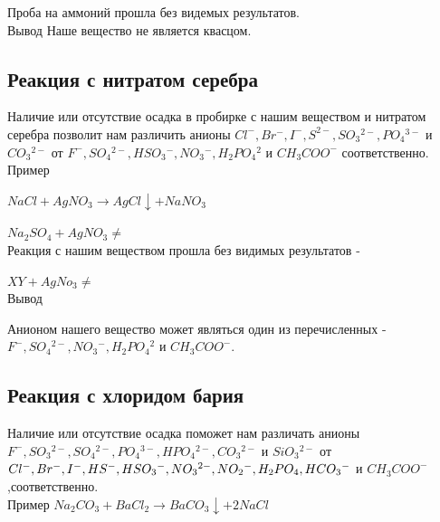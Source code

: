 \documentclass[a4paper,14pt,notitlepage,twoside]{article}
\begin{document}
            Проба на аммоний прошла без видемых результатов.\\

            Вывод\newline
            Наше вещество не является квасцом.



        \subsection{Реакция с нитратом серебра}
            Наличие или отсутствие осадка в пробирке с нашим веществом и нитратом серебра
            позволит нам различить анионы $Cl^-, Br^-, I^-,  S^{2-}, SO_3{}^{2-}, PO_4{}^{3-} $ и $ CO_3{}^{2-}$ 
            от $F^-, SO_4{}^{2-}, HSO_3{}^-, NO_3{}^-, H_2PO_4{}^2$ и $CH_3COO^-$ соответственно.\\
            
            Пример

            $NaCl + AgNO_3 \to AgCl\downarrow + NaNO_3$
            \par$Na_2SO_4 + AgNO_3 \ne$\\

            Реакция с нашим веществом прошла без видимых результатов -
            \par$XY + AgNo_3 \ne$\\


            Вывод

            Анионом нашего вещество может являться один из перечисленных -
            $F^-, SO_4{}^{2-}, NO_3{}^-, H_2PO_4{}^2$ и $CH_3COO^-$.

         \newpage
         \subsection{Реакция с хлоридом бария}
            Наличие или отсутствие осадка поможет нам различать анионы\newline
            $F^-, SO_3{}^{2-}, SO_4{}^{2-}, PO_4{}^{3-}, HPO_4{}^{2-}, CO_3{}^{2-}$ и 
            $SiO_3{}^{2-}$ от $Cl^-, Br^-, I^-, HS^-, \newline 
            HSO_3{}^-, NO_3{}^{2-}, NO_2{}^-, H_2PO_4, 
            HCO_3{}^-$ и $ CH_3COO^-$
            ,соответственно.\\

            Пример
            $Na_2CO_3 + BaCl_2 \to BaCO_3\downarrow + 2NaCl$\\
\end{document}
